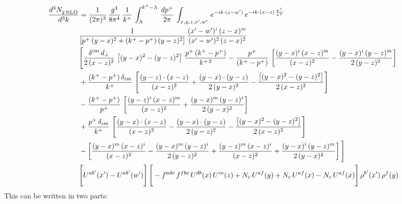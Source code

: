 \documentclass[9pt]{article}
\numberwithin{equation}{section}
\begin{document}
\begin{align}
    \frac{d^{3}N_{2\,\rm NLO}^{\rm}}{d^{3}k}  & =  \frac{1}{(2\pi)^{3}}\, \frac{g^{4}}{8\pi^{4}}\,\frac{1}{k^{+}}\,\int_{\Lambda}^{k^{+}-\Lambda}\, \frac{dp^{+}}{2\pi} \, \int_{x,y,z,x',w'}\,e^{-ik\cdot(z-w')}\,e^{-ik\cdot (x-z)\,\frac{p^{+}}{k^{+}}}\,\notag \\ & \frac{1}{\left[p^{+}\,(y-x)^{2}+(k^{+}-p^{+})\,(y-z)^{2}\right]}\, \frac{(x'-w')^{i}\,(z-x)^{m}}{(x'-w')^{2}\,(z-x)^{2}} \notag \\ & \Bigg[\frac{\delta^{im}\,d_{\perp}}{2\,(x-z)^{2}}\,\left[(y-x)^{2}-(y-z)^{2}\right]\,\frac{p^{+}\,(k^{+}-p^{+})}{k^{+\,2}}-\frac{p^{+}}{(k^{+}-p^{+})}\,\left[\frac{(y-x)^{i}\,(x-z)^{m}}{(x-z)^{2}}-\frac{(y-x)^{i}\,(y-z)^{m}}{2\,(y-z)^{2}}\right]\notag \\ & +\frac{(k^{+}-p^{+})\,\delta_{im}}{k^{+}}\,\left[\frac{(y-z)\cdot (x-z)}{(x-z)^{2}}+\frac{(y-x)\cdot (y-z)}{2\,(y-x)^{2}}-\frac{\left[(y-x)^{2}-(y-z)^{2}\right]}{2\,(x-z)^{2}}\right]\notag \\ & -\frac{(k^{+}-p^{+})}{p^{+}}\,\left[\frac{(y-z)^{i}\,(x-z)^{m}}{(x-z)^{2}}+\frac{(y-x)^{m}\,(y-z)^{i}}{2\,(y-x)^{2}}\right]\notag \\ & +\frac{p^{+}\,\delta_{im}}{k^{+}}\,\left[\frac{(y-x)\cdot (x-z)}{(x-z)^{2}}-\frac{(y-x)\cdot (y-z)}{2\,(y-z)^{2}}-\frac{\left[(y-x)^{2}-(y-z)^{2}\right]}{2\,(x-z)^{2}}\right]\notag \\ &-\left[\frac{(y-x)^{m}\,(x-z)^{i}}{(x-z)^{2}}-\frac{(y-x)^{m}\,(y-z)^{i}}{2\,(y-z)^{2}}+\frac{(y-z)^{m}\,(x-z)^{i}}{(x-z)^{2}}+\frac{(y-x)^{i}\,(y-z)^{m}}{2\,(y-x)^{2}}\right]\Bigg]\notag \\ & \Bigg[U^{ab'}(x')-U^{ab'}(w')\Bigg]\,\Bigg[-f^{adc}\,f^{fbe}\,U^{db}(x)\,U^{ce}(z)+N_{c}\,U^{af}(y)+N_{c}\,U^{af}(x) -N_{c}\,U^{af}(x)\Bigg]\,\rho^{b'}(x')\,\rho^{f}(y)
\end{align}
This can be written in two parts: 
\end{document}
